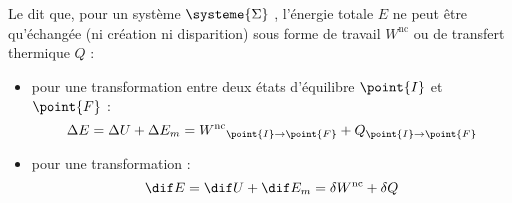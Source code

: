 \begin{definition}
Le  dit que, pour un système $\systeme{\Sigma}$ , l'énergie totale $E$ ne peut être qu'échangée (ni création ni disparition) sous forme de travail $W^{\mathrm{nc}}$ ou de transfert thermique $Q$ :
\begin{itemize}
\item pour une transformation entre deux états d'équilibre $\point{I}$ et $\point{F}$ :
\[\Delta E = \Delta U + \Delta E_m = {W^{\mathrm{nc}}}_{\point{I} \to \point{F}} + Q_{\point{I} \to \point{F}}\]

\item pour une transformation  :
\[\dif E = \dif U + \dif E_m = \delta W^{\mathrm{nc}} + \delta Q\]
\end{itemize}
\end{definition}